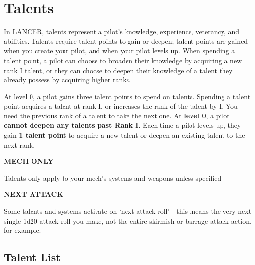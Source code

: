 \section{Talents}

In LANCER, talents represent a pilot’s knowledge, experience, veterancy, and abilities. Talents require talent points to gain or deepen; talent points are gained when you create your pilot, and when your pilot levels up. When spending a talent point, a pilot can choose to broaden their knowledge by acquiring a new rank I talent, or they can choose to deepen their knowledge of a talent they already possess by acquiring higher ranks. 

At level 0, a pilot gains three talent points to spend on talents. Spending a talent point acquires a talent at rank I, or increases the rank of the talent by I. You need the previous rank of a talent to take the next one. At \textbf{level 0}, a pilot \textbf{cannot deepen any talents past Rank I}. Each time a pilot levels up, they gain \textbf{1 talent point} to acquire a new talent or deepen an existing talent to the next rank. 

\begin{center}
\textbf{MECH ONLY}
\end{center}
Talents only apply to your mech’s systems and weapons unless specified


\begin{center}
\textbf{NEXT ATTACK}
\end{center}
Some talents and systems activate on ‘next attack roll’  - this means the very next single 1d20 attack roll you make, not the entire skirmish or barrage attack action, for example.

\subsection{Talent List}





























